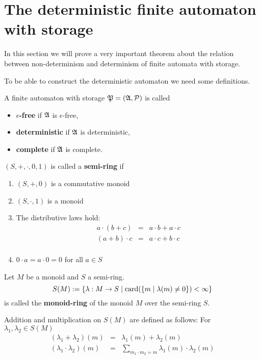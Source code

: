\section{The deterministic finite automaton with storage}

In this section we will prove a very important theorem about the relation
between non-determinism and determinism of finite automata with storage.

To be able to construct the deterministic automaton we need some definitions.

\begin{definition}
A finite automaton with storage $\mbox{$\mathfrak{P}$}=(\mbox{$\mathfrak{A}$},\mbox{$\mathcal{P}$})$ is called
\begin{itemize}
  \item {\bf $\epsilon$-free} if $\mbox{$\mathfrak{A}$}$ is $\epsilon$-free,
  \item {\bf deterministic} if $\mbox{$\mathfrak{A}$}$ is deterministic,
  \item {\bf complete} if $\mbox{$\mathfrak{A}$}$ is complete.
\end{itemize}
\end{definition}

\bigskip
\begin{definition}
$(S, +, \cdot, 0, 1)$ is called a {\bf semi-ring} if
\begin{enumerate}
  \item $(S, +, 0)$ is a commutative monoid
  \item $(S, \cdot, 1)$ is a monoid
  \item The distributive laws hold:
  \begin{eqnarray*}
  a \cdot (b + c) &=& a \cdot b + a \cdot c\\
  (a + b) \cdot c &=& a \cdot c + b \cdot c\\
  \end{eqnarray*}
  \item $0 \cdot a = a \cdot 0 = 0$ for all $a \in S$
\end{enumerate}
\end{definition}

\bigskip
\begin{definition}
Let $M$ be a monoid and $S$ a semi-ring.
\[ S(M) := \mbox{$\{\lambda: M \to S \mid \mathrm{card}({\mbox{$\{m \mid \lambda(m) \neq 0\}$}})
< \infty\}$} \]
is called the {\bf monoid-ring} of the monoid $M$ over the semi-ring $S$.
\end{definition}

Addition and multiplication on $S(M)$ are defined as follows: For $\lambda_1,
\lambda_2 \in S(M)$
\begin{eqnarray*}
(\lambda_1 + \lambda_2)(m) &=& \lambda_1(m) + \lambda_2(m) \\
(\lambda_1 \cdot \lambda_2)(m) &=& \sum_{m_1 \cdot m_2 = m} 
\lambda_1(m) \cdot \lambda_2(m)
\end{eqnarray*}

